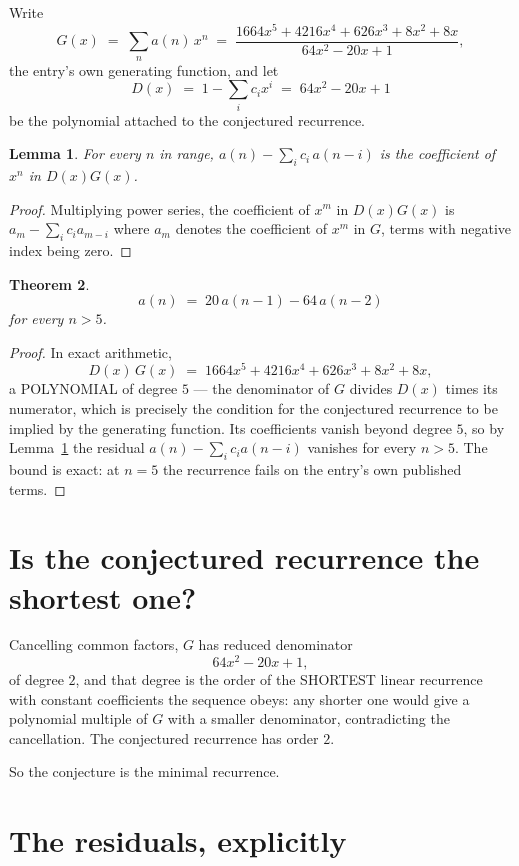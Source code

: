 \documentclass[11pt,a4paper]{article}
\theoremstyle{plain}
\newtheorem{theorem}{Theorem}
\newtheorem{lemma}[theorem]{Lemma}
\theoremstyle{definition}
\begin{document}
Write
\[
G(x)\;=\;\sum_{n}a(n)\,x^{n}\;=\;\frac{1664 x^{5} + 4216 x^{4} + 626 x^{3} + 8 x^{2} + 8 x}{64 x^{2} - 20 x + 1},
\]
the entry's own generating function, and let
\[
D(x)\;=\;1-\sum_i c_i x^{i}\;=\;64 x^{2} - 20 x + 1
\]
be the polynomial attached to the conjectured recurrence.

\begin{lemma}\label{lem:key}
For every $n$ in range, $a(n)-\sum_i c_i\,a(n-i)$ is the coefficient of $x^{n}$ in
$D(x)G(x)$.
\end{lemma}

\begin{proof}
Multiplying power series, the coefficient of $x^{m}$ in $D(x)G(x)$ is
$a_m-\sum_i c_i a_{m-i}$ where $a_m$ denotes the coefficient of $x^{m}$ in $G$, terms with
negative index being zero.
\end{proof}

\begin{theorem}
\[
a(n)\;=\;20\,a(n-1) - 64\,a(n-2)
\]
for every $n>5$.
\end{theorem}

\begin{proof}
In exact arithmetic,
\[
D(x)\,G(x)\;=\;1664 x^{5} + 4216 x^{4} + 626 x^{3} + 8 x^{2} + 8 x,
\]
a POLYNOMIAL of degree $5$ --- the denominator of $G$ divides $D(x)$ times its numerator,
which is precisely the condition for the conjectured recurrence to be implied by the
generating function. Its coefficients vanish beyond degree $5$, so by
Lemma~\ref{lem:key} the residual $a(n)-\sum_ic_ia(n-i)$ vanishes for every
$n>5$. The bound is exact: at $n=5$ the recurrence fails on the entry's own published terms.
\end{proof}

\section{Is the conjectured recurrence the shortest one?}

Cancelling common factors, $G$ has reduced denominator
\[
64 x^{2} - 20 x + 1,
\]
of degree $2$, and that degree is the order of the SHORTEST linear recurrence with
constant coefficients the sequence obeys: any shorter one would give a polynomial multiple of
$G$ with a smaller denominator, contradicting the cancellation. The conjectured recurrence has
order $2$.

So the conjecture is the minimal recurrence.

\section{The residuals, explicitly}
\end{document}
